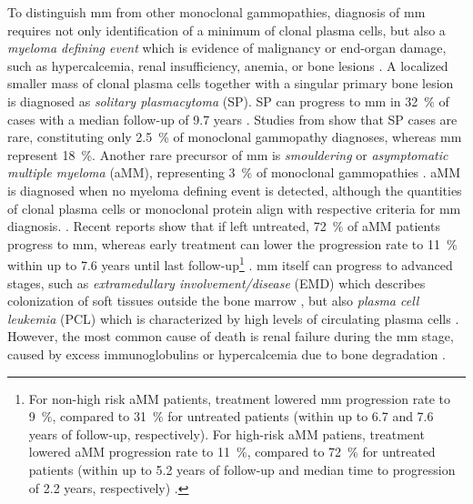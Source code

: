 To distinguish \ac{mm} from other monoclonal gammopathies, diagnosis of \ac{mm} requires
not only identification of a minimum of clonal plasma cells, but also a
\emph{myeloma defining event} which is evidence of malignancy or end-organ
damage, such as hypercalcemia, renal insufficiency, anemia, or bone lesions
\cite{rajkumarInternationalMyelomaWorking2014}. A localized
smaller mass of clonal plasma
cells together with a singular primary bone lesion is diagnosed as
\emph{solitary plasmacytoma} (SP). SP can progress to \ac{mm} in \SI{32}{\percent} of
cases with a median follow-up of 9.7 years
\cite{thumallapallySolitaryPlasmacytomaPopulationbased2017,
    gaoSolitaryBonePlasmacytoma2024}. Studies from
\citet{kyleMonoclonalGammopathyUndetermined1997} show that SP cases are rare,
constituting only \SI{2.5}{\percent} of monoclonal gammopathy diagnoses, whereas
\ac{mm} represent \SI{18}{\percent}. Another rare precursor of \ac{mm} is
\textit{smouldering} or \textit{asymptomatic multiple myeloma} (aMM), representing
\SI{3}{\percent} of monoclonal gammopathies
\cite{kyleMonoclonalGammopathyUndetermined1997}. aMM is diagnosed when no
myeloma defining event is detected, although the quantities of clonal plasma
cells or monoclonal protein align with respective criteria for \ac{mm} diagnosis.
\cite{rajkumarInternationalMyelomaWorking2014}. Recent reports show that if left
untreated, \SI{72}{\percent} of aMM patients progress to \ac{mm}, whereas early
treatment can lower the progression rate to \SI{11}{\percent} within up to 7.6
years until last follow-up\footnote{For non-high risk aMM patients, treatment
    lowered \ac{mm} progression rate to \SI{9}{\percent}, compared to \SI{31}{\percent}
    for untreated patients (within up to 6.7 and 7.6 years of follow-up,
    respectively). For high-risk aMM patiens, treatment lowered aMM progression rate
    to \SI{11}{\percent}, compared to \SI{72}{\percent} for untreated patients
    (within up to 5.2 years of follow-up and median time to progression of 2.2
    years, respectively) \cite{abdallahModeProgressionSmoldering2024}.}
\cite{abdallahModeProgressionSmoldering2024,
    mateosmaria-victoriaLenalidomideDexamethasoneHighRisk2013}. \ac{mm} itself can
progress to advanced stages, such as \emph{extramedullary involvement/disease}
(EMD) which describes colonization of soft tissues outside the bone marrow
\cite{bladeExtramedullaryDiseaseMultiple2022}, but also \emph{plasma cell
    leukemia} (PCL) which is characterized by high levels of circulating plasma
cells \cite{jungUpdatePrimaryPlasma2022}. However, the most common cause of
death is renal failure during the \ac{mm} stage, caused by excess immunoglobulins or
hypercalcemia due to bone degradation \cite{kunduMultipleMyelomaRenal2022}.


